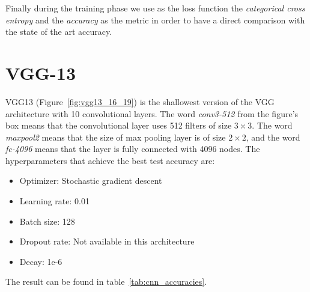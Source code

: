 Finally during the training phase we use as the loss function the \textit{categorical cross entropy} and the \textit{accuracy} as the metric in order to have a direct comparison with the state of the art accuracy. 

\section{VGG-13}
VGG13 (Figure~\ref{fig:vgg13_16_19}) is the shallowest version of the VGG architecture with 10 convolutional layers. The word \textit{conv3-512} from the figure's box means that the convolutional layer uses 512 filters of size $3\times 3$. The word \textit{maxpool2} means that the size of max pooling layer is of size $2\times 2$, and the word \textit{fc-4096} means that the layer is fully connected with 4096 nodes. The hyperparameters that achieve the best test accuracy are:

\begin{itemize}
  \item Optimizer: Stochastic gradient descent
  \item Learning rate: 0.01
  \item Batch size: 128
  \item Dropout rate: Not available in this architecture
  \item Decay: 1e-6
\end{itemize}

The result can be found in table~\ref{tab:cnn_accuracies}.

